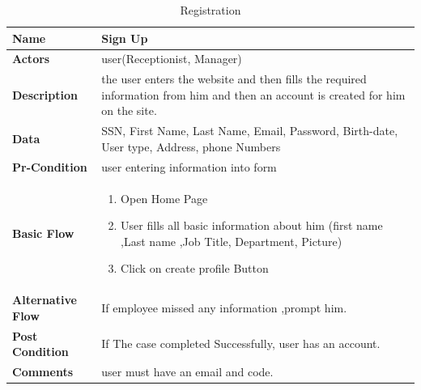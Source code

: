 \documentclass[../Psychological_system_web_application.tex]{subfiles}
\begin{document}
	\begin{center}
		\begin{table}[h!]
			\begin{tabular}{ | m{4cm} | m{10cm}| } 
				\hline
			 	\textbf{\large Name}& Sign Up\\
			 	
				\hline
			  	\textbf{\large Actors}& user(Receptionist, Manager)\\ 
								
				\hline
			  	\textbf{\large Description}& the user enters the website and then fills the required information from him and then an account is created for him on the site.\\
			  	 
				\hline
				\textbf{\large Data}&SSN, First Name, Last Name, Email, Password, Birth-date, User type, Address, phone Numbers \\ 
				
				\hline
				 \textbf{\large Pr-Condition}&user entering information into form \\
				
				\hline
				\textbf{\large Basic Flow}&\begin{enumerate}
				\item
					Open Home Page 
				\item
					User fills all basic information about him (first name ,Last name ,Job Title, Department, Picture)
				\item
					Click on create profile Button \end{enumerate}				 \\
				
				\hline
				\textbf{\large Alternative Flow}& If employee missed any information ,prompt him.\\ 
								
				\hline
				\textbf{\large Post Condition}& If The case completed Successfully, user has an account.\\ 
								
				\hline
				\textbf{\large Comments}& user must have  an email and code.\\ 
				\hline
			\end{tabular}
			\caption{Registration}
			\label{table:Registration}
		\end{table}
	\end{center}
\end{document}
